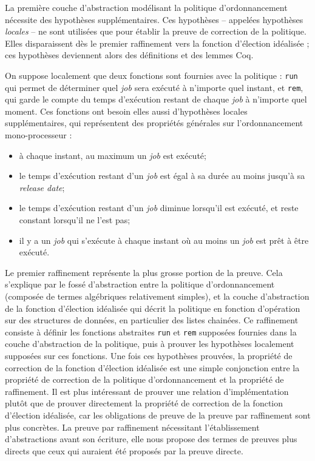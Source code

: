 	La première couche d'abstraction modélisant la politique d'ordonnancement nécessite des hypothèses supplémentaires. Ces hypothèses -- appelées hypothèses \emph{locales} -- ne sont utilisées que pour établir la preuve de correction de la politique. Elles disparaissent dès le premier raffinement vers la fonction d'élection idéalisée ; ces hypothèses deviennent alors des définitions et des lemmes Coq.

	On suppose localement que deux fonctions sont fournies avec la politique : \texttt{run} qui permet de déterminer quel \emph{job} sera exécuté à n'importe quel instant, et \texttt{rem}, qui garde le compte du temps d'exécution restant de chaque \emph{job} à n'importe quel moment.
	Ces fonctions ont besoin elles aussi d'hypothèses locales supplémentaires, qui représentent des propriétés générales sur l'ordonnancement mono-processeur :
	
	\begin{itemize}
		\item à chaque instant, au maximum un \emph{job} est exécuté;
		\item le temps d'exécution restant d'un \emph{job} est égal à sa durée au moins jusqu'à sa \emph{release date};
		\item le temps d'exécution restant d'un \emph{job} diminue lorsqu'il est exécuté, et reste constant lorsqu'il ne l'est pas;
		\item il y a un \emph{job} qui s'exécute à chaque instant où au moins un \emph{job} est prêt à être exécuté.
	\end{itemize}

	Le premier raffinement représente la plus grosse portion de la preuve. Cela s'explique par le fossé d'abstraction entre la politique d'ordonnancement (composée de termes algébriques relativement simples), et la couche d'abstraction de la fonction d'élection idéalisée qui décrit la politique en fonction d'opération sur des structures de données, en particulier des listes chainées. Ce raffinement consiste à définir les fonctions abstraites \texttt{run} et \texttt{rem} supposées fournies dans la couche d'abstraction de la politique, puis à prouver les hypothèses localement supposées sur ces fonctions.
		Une fois ces hypothèses prouvées, la propriété de correction de la fonction d'élection idéalisée est une simple conjonction entre la propriété de correction de la politique d'ordonnancement et la propriété de raffinement. Il est plus intéressant de prouver une relation d'implémentation plutôt que de prouver directement la propriété de correction de la fonction d'élection idéalisée, car les obligations de preuve de la preuve par raffinement sont plus concrètes. La preuve par raffinement nécessitant l'établissement d'abstractions avant son écriture, elle nous propose des termes de preuves plus directs que ceux qui auraient été proposés par la preuve directe.

